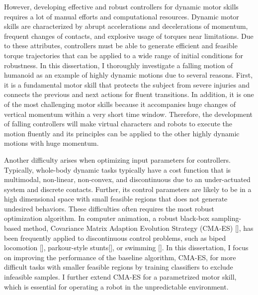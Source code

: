 However, developing effective and robust controllers for dynamic motor skills 
requires a lot of manual efforts and computational resources.
Dynamic motor skills are characterized by abrupt accelerations and 
decelerations of momentum,
frequent changes of contacts, and explosive usage of torques near limitations.
Due to these attributes, controllers must be able to generate efficient
and feasible torque trajectories that can be applied to a wide range of initial
conditions for robustness.
In this dissertation, I thoroughly investigate a falling motion of humanoid 
as an example of highly dynamic motions due to several reasons.
First, it is a fundamental motor skill that protects the subject from 
severe injuries and connects the previous and next actions for fluent
transitions.
In addition, it is one of the most challenging motor skills because 
it accompanies huge changes of vertical momentum within 
a very short time window.
Therefore, the development of falling controllers will make virtual 
characters and robots to execute the motion fluently
and its principles can be applied to the other highly dynamic motions
with huge momentum.

Another difficulty arises when optimizing input parameters for controllers.
Typically, whole-body dynamic tasks typically have a cost function
that is multimodal, non-linear, non-convex, and discontinuous due to 
an under-actuated system and discrete contacts.
Further, its control parameters are likely to be in a high dimensional
space with small feasible regions that does not generate undesired behaviors.
These difficulties often requires the most robust optimization algorithm.
In computer animation, a robust black-box sampling-based method, 
Covariance Matrix Adaption Evolution Strategy (CMA-ES) [], has been frequently
applied to discontinuous control problems, such as biped locomotion [],
parkour-style stunts[], or swimming [].
In this dissertation, I focus on improving the performance of the baseline
algorithm, CMA-ES, for more difficult tasks with smaller feasible regions
by training classifiers to exclude infeasible samples.
I further extend CMA-ES for a parametrized motor skill, which is essential
for operating a robot in the unpredictable environment.


